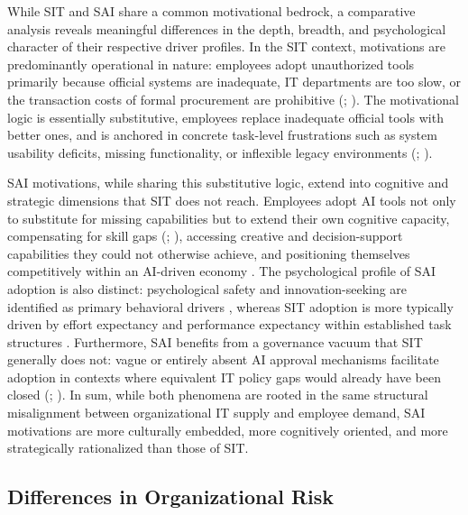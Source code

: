 \documentclass[12pt,oneside]{article}
\begin{document}
While \ac{SIT} and \ac{SAI} share a common motivational bedrock, a comparative analysis reveals meaningful differences in the depth, breadth, and psychological character of their respective driver profiles. In the \ac{SIT} context, motivations are predominantly operational in nature: employees adopt unauthorized tools primarily because official systems are inadequate, \ac{IT} departments are too slow, or the transaction costs of formal procurement are prohibitive (\citealp[7]{zimmermann2014managing}; \citealp[3]{keskin2021domesticating}). The motivational logic is essentially substitutive, employees replace inadequate official tools with better ones, and is anchored in concrete task-level frustrations such as system usability deficits, missing functionality, or inflexible legacy environments (\citealp[108]{myers2017impact}; \citealp[1]{nwankpa2024shadow}).

\ac{SAI} motivations, while sharing this substitutive logic, extend into cognitive and strategic dimensions that \ac{SIT} does not reach. Employees adopt \ac{AI} tools not only to substitute for missing capabilities but to extend their own cognitive capacity, compensating for skill gaps (\citealp[1-2]{ross2025shadowai}; \citealp[3]{an2024impact}), accessing creative and decision-support capabilities they could not otherwise achieve, and positioning themselves competitively within an \ac{AI}-driven economy \citep[105]{myers2017impact}. The psychological profile of \ac{SAI} adoption is also distinct: psychological safety and innovation-seeking are identified as primary behavioral drivers \citep[1138]{raizada2026shadowai}, whereas \ac{SIT} adoption is more typically driven by effort expectancy and performance expectancy within established task structures \citep[500, 505]{nguyen2024understanding}. Furthermore, \ac{SAI} benefits from a governance vacuum that \ac{SIT} generally does not: vague or entirely absent \ac{AI} approval mechanisms facilitate adoption in contexts where equivalent \ac{IT} policy gaps would already have been closed (\citealp[1140]{raizada2026shadowai}; \citealp[1]{silic2025shadow}). In sum, while both phenomena are rooted in the same structural misalignment between organizational \ac{IT} supply and employee demand, \ac{SAI} motivations are more culturally embedded, more cognitively oriented, and more strategically rationalized than those of \ac{SIT}.

\subsection{Differences in Organizational Risk} \label{differences-in-organizational-risk}
\end{document}
